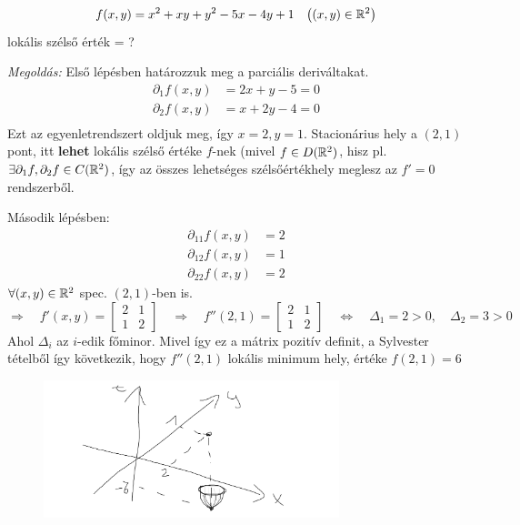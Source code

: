 \documentclass[a4paper,11.5pt]{article}
\begin{document}
	\begin{example}
		\[ f(x,y)=x^2+xy+y^2-5x-4y+1\quad \big((x,y)\in\mathbb{R}^2\big) \]
		lokális szélső érték = ?
		
		\textit{Megoldás:} Első lépésben határozzuk meg a parciális deriváltakat.
		\begin{align*}
			\partial_1f(x,y)&=2x+y-5 = 0\\
			\partial_2f(x,y)&=x+2y-4=0\\
		\end{align*}
		Ezt az egyenletrendszert oldjuk meg, így $x=2, y=1$. Stacionárius hely a $(2,1)$ pont, itt \textbf{lehet} lokális szélső értéke $f$-nek (mivel $f\in D(\mathbb{R}^2)$, hisz pl. $\exists \partial_1f,\partial_2f\in C(\mathbb{R}^2)$, így az összes lehetséges szélsőértékhely meglesz az $f'=0$ rendszerből.
		
		Második lépésben: 
		\begin{align*}
			\partial_{11}f(x,y)&=2 \\
			\partial_{12}f(x,y)&=1 \\
			\partial_{22}f(x,y)&=2 
		\end{align*} 
		$\forall(x,y)\in\mathbb{R}^2$ spec. $(2,1)$-ben is.
		\[ \Rightarrow\quad f'(x,y)=\begin{bmatrix}
			2&1\\
			1&2
		\end{bmatrix}\quad \Rightarrow\quad f''(2,1)=\begin{bmatrix}
			2&1\\
			1&2
		\end{bmatrix}\quad \Leftrightarrow\quad \varDelta_1=2>0,\quad \varDelta_2=3>0 \]
		Ahol $\varDelta_i$ az $i$-edik főminor. Mivel így ez a mátrix pozitív definit, a Sylvester tételből így következik, hogy $f''(2,1)$ lokális minimum hely, értéke $f(2,1)=6$
		\begin{figure}[H]
			\centering
			\includegraphics[height=4cm]{../2zh/kepek/38.png}
			\caption{}
		\end{figure}
	\end{example}
\end{document}
